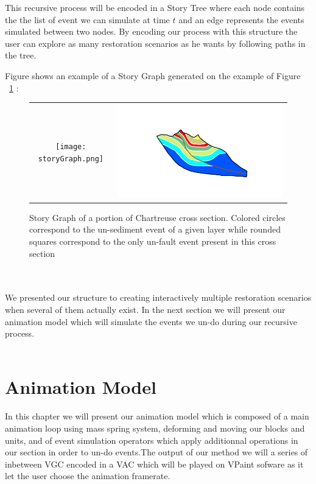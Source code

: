 \documentclass[12pt, a4paper]{report} %
\begin{document}
This recursive process will be encoded in a Story Tree where each node contains the the list of event we can simulate at time $t$ and an edge represents the events simulated between two nodes. By encoding our process with this structure the user can explore as many restoration scenarios as he wants by following paths in the tree.

Figure shows an example of a Story Graph generated on the example of Figure ~\ref{strorygraph} :

\begin{figure}[htb]
\centering
\begin{tabular}{@{}cc@{}}
\texttt{[image: storyGraph.png]}&
\includegraphics[width=.35\textwidth]{chartreusedroite.png}\\
\end{tabular}
\caption{Story Graph of a portion of Chartreuse cross section. Colored circles correspond to the un-sediment event of a given layer while rounded squares correspond to the only un-fault event present in this cross section}
\label{strorygraph}
\end{figure}\\\\

We presented our structure to creating interactively multiple restoration scenarios when several of them actually exist. In the next section we will present our animation model which will simulate the events we un-do during our recursive process.\\\\

\chapter{Animation Model}
In this chapter we will present our animation model which is composed of a main animation loop using mass spring system, deforming and moving our blocks and units, and of event simulation operators which apply additionnal operations in our section in order to un-do events.The output of our method we will a series of inbetween VGC encoded in a VAC which will be played on VPaint sofware \cite{vpaint} as it let the user choose the animation framerate.\\\\
\end{document}
